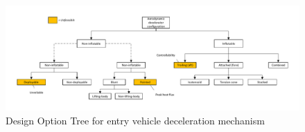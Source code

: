 \begin{figure}[H]
\centering
\hspace{-10mm}
\includegraphics[width = 1.1\textwidth]{Figure/DOT_configuration.pdf}
\caption{Design Option Tree for entry vehicle deceleration mechanism}
\label{fig:dotconfig}
\end{figure}




